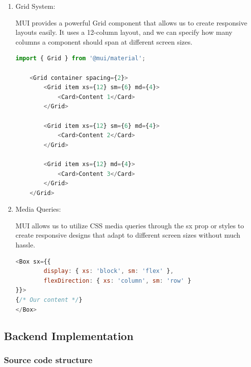 	\begin{enumerate}
		\item Grid System:
		
		MUI provides a powerful Grid component that allows us to create responsive layouts easily. It uses a 12-column layout, and we can specify how many columns a component should span at different screen sizes.


\begin{lstlisting}[language=Javascript, breaklines=true, caption=MUI Grid System]
import { Grid } from '@mui/material';

	<Grid container spacing={2}>
		<Grid item xs={12} sm={6} md={4}>
			<Card>Content 1</Card>
		</Grid>
		
		<Grid item xs={12} sm={6} md={4}>
			<Card>Content 2</Card>
		</Grid>
	
		<Grid item xs={12} md={4}>
			<Card>Content 3</Card>
		</Grid>
	</Grid>
\end{lstlisting}		

	\item Media Queries:
	
	MUI allows us to utilize CSS media queries through the sx prop or styles to create responsive designs that adapt to different screen sizes without much hassle.

\begin{lstlisting}[language=Javascript, breaklines=true, caption=MUI Media Queries]
<Box sx={{ 
		display: { xs: 'block', sm: 'flex' }, 
		flexDirection: { xs: 'column', sm: 'row' } 
}}>
{/* Our content */}
</Box>

\end{lstlisting}	


		
	\end{enumerate}

\subsection{Backend Implementation}
	\subsubsection{Source code structure}
	
